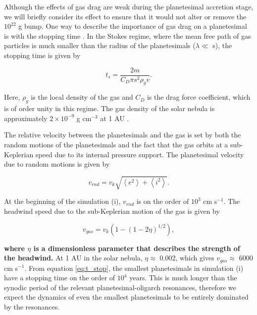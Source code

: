 Although the effects of gas drag are weak during the planetesimal accretion stage, we will briefly consider its effect to ensure 
that it would not alter or remove the $10^{22}$ g bump. One way to describe the importance of gas drag on a planetesimal is 
with the stopping time \cite{adachi76}. In the Stokes regime, where the mean free path of gas particles is much smaller than the 
radius of the planetesimals ($\lambda \ll$ s), the stopping time is given by

\begin{equation}\label{eq:t_stop}
    t_{s} = \frac{2 m}{C_{D} \pi s^{2} \rho_{g} v}.
\end{equation}

\noindent Here, $\rho_{g}$ is the local density of the gas and $C_{D}$ is the drag force coefficient, which is of order unity in this 
regime. The gas density of the solar nebula is approximately $2 \times 10^{-9}$ g cm$^{-3}$ at 1 AU \cite{hayashi81}.

The relative velocity between the planetesimals and the gas is set by both the random motions of the planetesimals and the fact 
that the gas orbits at a sub-Keplerian speed due to its internal pressure support. The planetesimal velocity due to random 
motions is given by \cite{lissauer93}

\begin{equation}\label{eq:vrnd}
    v_{rnd} = v_{k} \sqrt{\left< e^2\right> + \left< i^2\right>}.
\end{equation}

\noindent At the beginning of the simulation (i), $v_{rnd}$ is on the order of $10^3$ cm s$^{-1}$. The headwind speed due to the 
sub-Keplerian motion of the gas is given by \cite{adachi76}

\begin{equation}\label{eq:vgas}
    v_{gas} = v_{k} \left( 1 - (1 - 2 \eta)^{1/2} \right),
\end{equation}

\noindent \textbf{where $\eta$ is a dimensionless parameter that describes the strength of the headwind.} At 1 AU in the solar nebula, $\eta \approx$ 0.002, which gives $v_{gas} \approx$ 6000 cm s$^{-1}$. From equation 
\ref{eq:t_stop}, the smallest planetesimals in simulation (i) have a stopping time on the order of $10^4$ years. This is much 
longer than the synodic period of the relevant planetesimal-oligarch resonances, therefore we expect the dynamics of even the 
smallest planetesimals to be entirely dominated by the resonances.

